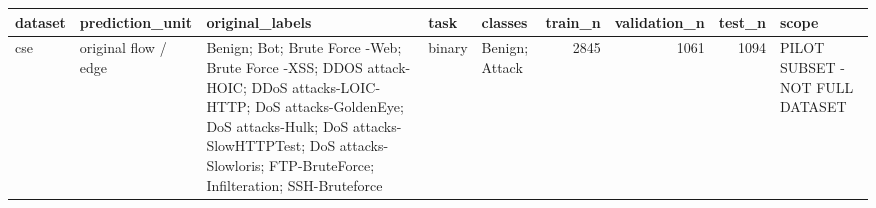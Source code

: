 \begin{tabular}{lllllrrrl}
\toprule
dataset & prediction\_unit & original\_labels & task & classes & train\_n & validation\_n & test\_n & scope \\
\midrule
cse & original flow / edge & Benign; Bot; Brute Force -Web; Brute Force -XSS; DDOS attack-HOIC; DDoS attacks-LOIC-HTTP; DoS attacks-GoldenEye; DoS attacks-Hulk; DoS attacks-SlowHTTPTest; DoS attacks-Slowloris; FTP-BruteForce; Infilteration; SSH-Bruteforce & binary & Benign; Attack & 2845 & 1061 & 1094 & PILOT SUBSET - NOT FULL DATASET \\
\bottomrule
\end{tabular}
